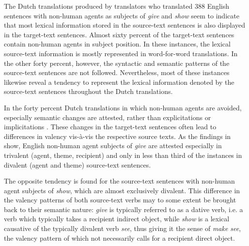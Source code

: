 \documentclass[output=paper]{LSP/langsci}
\begin{document}
The Dutch translations produced by translators who translated 388 English sentences with non-human agents as subjects of \textit{give} and \textit{show} seem to indicate that most lexical information stored in the source-text sentences is also displayed in the target-text sentences. Almost sixty percent of the target-text sentences contain non-human agents in subject position. In these instances, the lexical source-text information is mostly represented in word-for-word translations. In the other forty percent, however, the syntactic and semantic patterns of the source-text sentences are not followed. Nevertheless, most of these instances likewise reveal a tendency to represent the lexical information denoted by the source-text sentences throughout the Dutch translations.

In the forty percent Dutch translations in which non-human agents are avoid\-ed, especially semantic changes are attested, rather than explicitations or implicitations \citep[see][]{Vandepitte2007}. These changes in the target-text sentences often lead to differences in valency vis-à-vis the respective source texts. As the findings in  show, English non-human agent subjects of \textit{give} are attested especially in trivalent (agent, theme, recipient) and only in less than third of the instances in divalent (agent and theme) source-text sentences. 	

The opposite tendency is found for the source-text sentences with non-human agent subjects of \textit{show}, which are almost exclusively divalent. This difference in the valency patterns of both source-text verbs may to some extent be brought back to their semantic nature: \textit{give} is typically referred to as a dative verb, i.e. a verb which typically takes a recipient indirect object, while \textit{show} is a lexical causative of the typically divalent verb \textit{see}, thus giving it the sense of \textit{make see}, the valency pattern of which not necessarily calls for a recipient direct object.
\end{document}
